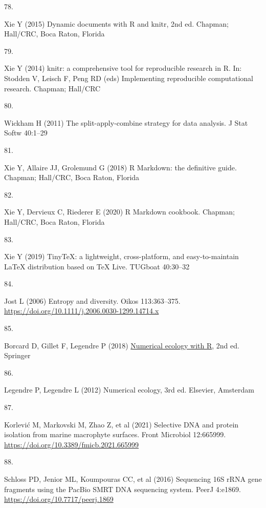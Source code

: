 \documentclass[
  12 pt,
]{article}
\newlength{\cslhangindent}
\newlength{\csllabelwidth}
\newenvironment{CSLReferences}[2] %
 {\begin{list}{}{%
  \setlength{\itemindent}{0pt}
  \setlength{\leftmargin}{0pt}
  \setlength{\parsep}{0pt}
  \ifodd #1
   \setlength{\leftmargin}{\cslhangindent}
   \setlength{\itemindent}{-1\cslhangindent}
  \fi
  \setlength{\itemsep}{#2\baselineskip}}}
 {\end{list}}
\newcommand{\CSLLeftMargin}[1]{\parbox[t]{\csllabelwidth}{\strut#1\strut}}
\newcommand{\CSLRightInline}[1]{\parbox[t]{\linewidth - \csllabelwidth}{\strut#1\strut}}
\begin{document}
\begin{CSLReferences}{0}{0}
\CSLLeftMargin{78. }%
\CSLRightInline{Xie Y (2015) Dynamic documents with {R} and knitr, 2nd ed. Chapman; Hall/CRC, Boca Raton, Florida}

\CSLLeftMargin{79. }%
\CSLRightInline{Xie Y (2014) {knitr}: {a} comprehensive tool for reproducible research in {R}. In: Stodden V, Leisch F, Peng RD (eds) {Implementing reproducible computational research}. Chapman; Hall/CRC}

\CSLLeftMargin{80. }%
\CSLRightInline{Wickham H (2011) The split-apply-combine strategy for data analysis. J Stat Softw 40:1--29}

\CSLLeftMargin{81. }%
\CSLRightInline{Xie Y, Allaire JJ, Grolemund G (2018) R {Markdown}: {the} definitive guide. Chapman; Hall/CRC, Boca Raton, Florida}

\CSLLeftMargin{82. }%
\CSLRightInline{Xie Y, Dervieux C, Riederer E (2020) R {Markdown} cookbook. Chapman; Hall/CRC, Boca Raton, Florida}

\CSLLeftMargin{83. }%
\CSLRightInline{Xie Y (2019) TinyTeX: {a} lightweight, cross-platform, and easy-to-maintain LaTeX distribution based on {TeX Live}. TUGboat 40:30--32}

\CSLLeftMargin{84. }%
\CSLRightInline{Jost L (2006) Entropy and diversity. Oikos 113:363--375. \url{https://doi.org/10.1111/j.2006.0030-1299.14714.x}}

\CSLLeftMargin{85. }%
\CSLRightInline{Borcard D, Gillet F, Legendre P (2018) \href{https://doi.org/10.1007/978-3-319-71404-2}{Numerical ecology with {R}}, 2nd ed. Springer}

\CSLLeftMargin{86. }%
\CSLRightInline{Legendre P, Legendre L (2012) Numerical ecology, 3rd ed. Elsevier, Amsterdam}

\CSLLeftMargin{87. }%
\CSLRightInline{Korlević M, Markovski M, Zhao Z, et al (2021) Selective {DNA} and protein isolation from marine macrophyte surfaces. Front Microbiol 12:665999. \url{https://doi.org/10.3389/fmicb.2021.665999}}

\CSLLeftMargin{88. }%
\CSLRightInline{Schloss PD, Jenior ML, Koumpouras CC, et al (2016) Sequencing {16S rRNA} gene fragments using the {PacBio SMRT DNA} sequencing system. PeerJ 4:e1869. \url{https://doi.org/10.7717/peerj.1869}}


\end{CSLReferences}
\end{document}
